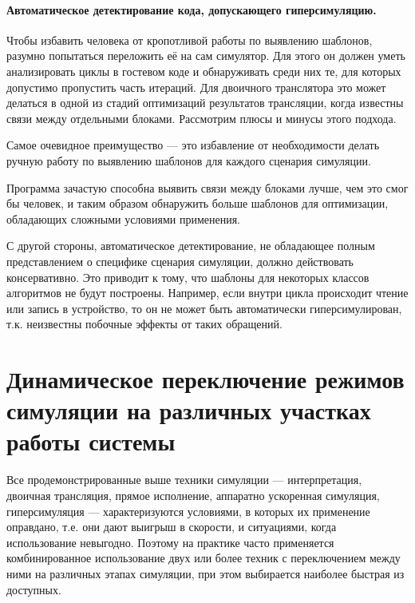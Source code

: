 \paragraph{Автоматическое детектирование кода, допускающего гиперсимуляцию.} Чтобы избавить человека от кропотливой работы по выявлению шаблонов, разумно попытаться переложить её на сам симулятор. Для этого он должен уметь анализировать циклы в гостевом коде и обнаруживать среди них те, для которых допустимо пропустить часть итераций. Для двоичного транслятора это может делаться в одной из стадий оптимизаций результатов трансляции, когда известны связи между отдельными блоками. Рассмотрим плюсы и минусы этого подхода.

\begin{itemize*}
    \item Самое очевидное преимущество — это избавление от необходимости делать ручную работу по выявлению шаблонов для каждого сценария симуляции.
    \item Программа зачастую способна выявить связи между блоками лучше, чем это смог бы человек, и таким образом обнаружить больше шаблонов для оптимизации, обладающих сложными условиями применения.
    \item С другой стороны, автоматическое детектирование, не обладающее полным представлением о специфике сценария симуляции, должно действовать консервативно. Это приводит к тому, что шаблоны для некоторых классов алгоритмов не будут построены. Например, если внутри цикла происходит чтение или запись в устройство, то он не может быть автоматически гиперсимулирован, т.к. неизвестны побочные эффекты от таких обращений.
\end{itemize*}

\section[Динамическое  переключение режимов симуляции]{Динамическое  переключение режимов симуляции на различных участках работы системы}

Все продемонстрированные выше техники симуляции — интерпретация, двоичная трансляция, прямое исполнение, аппаратно ускоренная симуляция, гиперсимуляция —  характеризуются условиями, в которых их применение оправдано, т.е. они дают выигрыш в скорости, и ситуациями, когда использование невыгодно. Поэтому на практике часто применяется комбинированное использование двух или более техник с переключением между ними на различных этапах симуляции, при этом выбирается наиболее быстрая из доступных.

